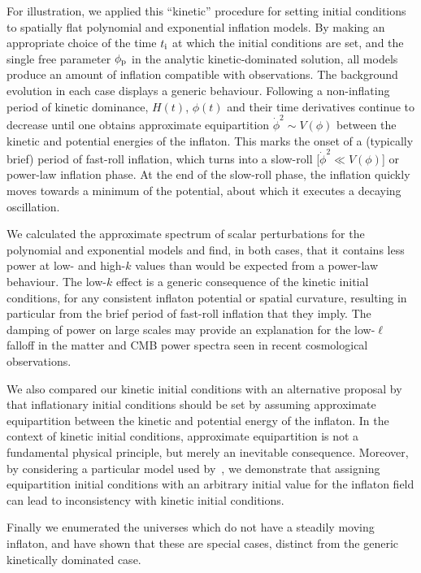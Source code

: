For illustration, we applied this ``kinetic'' procedure for setting initial conditions to spatially flat polynomial and exponential inflation models.  By making an appropriate choice of the time \(t_{\mathrm{i}}\) at which the initial conditions are set, and the single free parameter \(\phi_{\mathrm{p}}\) in the analytic kinetic-dominated solution, all models produce an amount of inflation compatible with observations.  The background evolution in each case displays a generic behaviour.  Following a non-inflating period of kinetic dominance, \(H(t)\), \(\phi(t)\) and their time derivatives continue to decrease until one obtains approximate equipartition \(\dot{\phi}^2 \sim V(\phi)\) between the kinetic and potential energies of the inflaton. This marks the onset of a (typically brief) period of fast-roll inflation, which turns into a slow-roll [\(\dot{\phi}^2 \ll V(\phi)\)] or power-law inflation phase.  At the end of the slow-roll phase, the inflation quickly moves towards a minimum of the potential, about which it executes a decaying oscillation.

We calculated the approximate spectrum of scalar perturbations for the polynomial and exponential models and find, in both cases, that it contains less power at low- and high-\(k\) values than would be expected from a power-law behaviour. The low-\(k\) effect is a generic consequence of the kinetic initial conditions, for any consistent inflaton potential or spatial curvature, resulting in particular from the brief period of fast-roll inflation that they imply.  The damping of power on large scales may provide an explanation for the low-\(\ell\) falloff in the matter and CMB power spectra seen in recent cosmological observations.

We also compared our kinetic initial conditions with an alternative proposal by~\cite{boyanovsky_cmb_2006} that inflationary initial conditions should be set by assuming approximate equipartition between the kinetic and potential energy of the inflaton.  In the context of kinetic initial conditions, approximate equipartition is not a fundamental physical principle, but merely an inevitable consequence.  Moreover, by considering a particular model used by~\cite{boyanovsky_cmb_2006}, we demonstrate that assigning equipartition initial conditions with an arbitrary initial value for the inflaton field can lead to inconsistency with kinetic initial conditions.

Finally we enumerated the universes which do not have a steadily moving inflaton, and have shown that these are special cases, distinct from the generic kinetically dominated case.





\begin{subappendices}
  
\end{subappendices}

